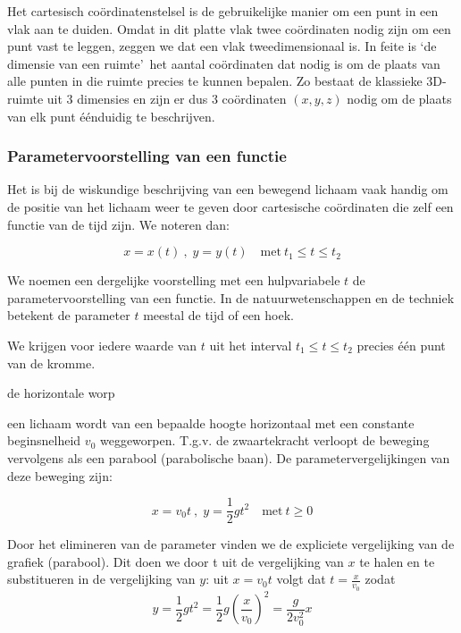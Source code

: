 Het cartesisch co\"ordinatenstelsel is de gebruikelijke manier
om een punt in een vlak aan te duiden. Omdat in dit platte vlak twee
co\"ordinaten nodig zijn om een punt vast te leggen, zeggen we dat een
vlak tweedimensionaal is. In feite is \textquoteleft de dimensie van een ruimte\textquoteright \
het aantal co\"ordinaten dat nodig is om de plaats van alle punten in
die ruimte precies te kunnen bepalen. Zo bestaat de klassieke 3D-ruimte
uit 3 dimensies en zijn er dus 3 co\"ordinaten $(x,y,z)$ nodig om de
plaats van elk punt \'e\'enduidig te beschrijven. 

\subsubsection{Parametervoorstelling van een functie}

Het is bij de wiskundige beschrijving van een bewegend lichaam
vaak handig om de positie van het lichaam weer te geven door cartesische
co\"ordinaten die zelf een functie van de tijd zijn. We noteren dan:

\begin{equation*}
x=x(t)\:,\;y=y(t)\quad\textrm{met}\:t_{1}\leq t\leq t_{2}
\end{equation*}

We noemen een dergelijke voorstelling met een hulpvariabele
$t$ de parametervoorstelling van een functie. In de natuurwetenschappen
en de techniek betekent de parameter $t$ meestal de tijd of een hoek.

We krijgen voor iedere waarde van $t$ uit het interval $t_{1}\leq t\leq t_{2}$
precies \'e\'en punt van de kromme.


\begin{voorbeeld}
	de horizontale worp

een lichaam wordt van een bepaalde hoogte horizontaal met
een constante beginsnelheid $v_{0}$ weggeworpen. T.g.v. de zwaartekracht
verloopt de beweging vervolgens als een parabool (parabolische baan).
De parametervergelijkingen van deze beweging zijn:

\begin{equation*}
x=v_{0}t\:,\;y=\frac{1}{2}gt^{2}\quad\textrm{met}\:t\geq0
\end{equation*}


Door het elimineren van de parameter vinden we de expliciete
vergelijking van de grafiek (parabool). Dit doen we door t uit de
vergelijking van $x$ te halen en te substitueren in de vergelijking
van $y$: uit $x=v_{0}t$ volgt dat $t=\frac{x}{v_{0}}$ zodat \begin{equation*}
y=\frac{1}{2}gt^{2}=\frac{1}{2}g\left(\frac{x}{v_{0}}\right)^{2}=\frac{g}{2v_{0}^{2}}x
\end{equation*}

\end{voorbeeld}

